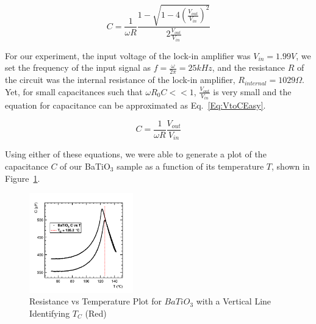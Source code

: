 \documentclass[%
 reprint,
 amsmath,amssymb,
 aps,
 pra,
]{revtex4-1}
\begin{document}
\begin{equation}\label{Eq:VtoC}
C = \frac{1}{\omega R} \frac{1 - \sqrt{1 - 4(\frac{V_{out}}{V_{in}})^2 }}{2\frac{V_{out}}{V_{in}}}
\end{equation}

\noindent For our experiment, the input voltage of the lock-in amplifier was $V_{in} = 1.99V$, we set the frequency of the input signal as $f = \frac{\omega}{2\pi} = 25kHz$, and the resistance $R$ of the circuit was the internal resistance of the lock-in amplifier, $R_{internal} = 1029 \Omega$. Yet, for small capacitances such that $\omega R_{0} C << 1$, $\frac{V_{out}}{V_{in}}$ is very small and the equation for capacitance can be approximated as Eq.~\ref{Eq:VtoCEasy}. 

\begin{equation}\label{Eq:VtoCEasy}
C = \frac{1}{\omega R} \frac{V_{out}}{V_{in}}
\end{equation}

\noindent Using either of these equations, we were able to generate a plot of the capacitance $C$ of our BaTiO$_{3}$ sample as a function of its temperature $T$, shown in Figure~\ref{Fig:CvT1}.

\begin{figure}[H]
	\centering
	\includegraphics[width=0.4\textwidth]{BaTiO3_CvT_withTC.png}
	\caption{Resistance vs Temperature Plot for $BaTiO_{3}$ with a Vertical Line Identifying $T_{C}$ (Red)}
	\label{Fig:CvT1}
\end{figure}
\end{document}
